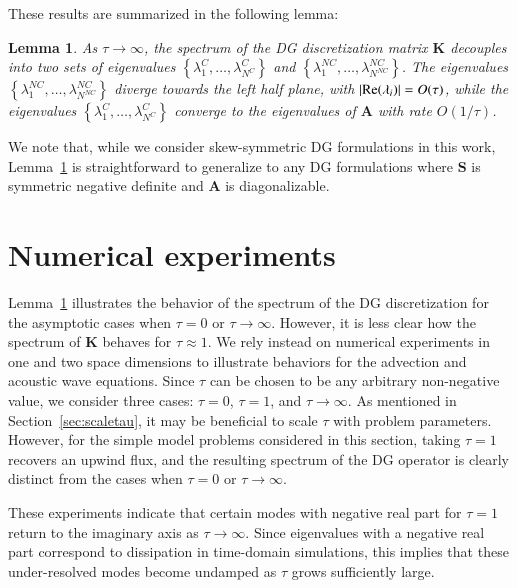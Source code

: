\documentclass[preprint,10pt]{elsarticle}
\newcommand{\LRb}[1]{\left| #1 \right|}
\newcommand{\LRc}[1]{\left\{ #1 \right\}}
\newtheorem{lemma}[theorem]{Lemma}
\newcommand{\note}[1]{#1}
\begin{document}
These results are summarized in the following lemma:
\begin{lemma}
As $\tau \rightarrow \infty$, the spectrum of the DG discretization matrix $\bm{K}$ decouples into two sets of eigenvalues $\LRc{\lambda^C_1,\ldots,\lambda^C_{N^C}}$ and $\LRc{\lambda^{NC}_1,\ldots,\lambda^{NC}_{N^{NC}}}$.  The eigenvalues $\LRc{\lambda^{NC}_1,\ldots,\lambda^{NC}_{N^{NC}}}$ diverge towards the left half plane, with $\LRb{{\rm Re}(\lambda_i)} = O(\tau)$, while  the eigenvalues $\LRc{\lambda^C_1,\ldots,\lambda^C_{N^C}}$ converge to the eigenvalues of $\bm{A}$ with rate $O(1/\tau)$.  
\label{lemma:eig}
\end{lemma}
We note that, while we consider skew-symmetric DG formulations in this work, Lemma~\ref{lemma:eig} is straightforward to generalize to any DG formulations where $\bm{S}$ is symmetric negative definite and $\bm{A}$ is diagonalizable.%


\section{Numerical experiments}

Lemma~\ref{lemma:eig} illustrates the behavior of the \note{spectrum} of the DG discretization for the asymptotic cases when $\tau = 0$ or $\tau \rightarrow \infty$.  However, it is less clear how the \note{spectrum} of $\bm{K}$ behaves for $\tau \approx 1$.  We rely instead on numerical experiments in one and two space dimensions to illustrate behaviors for the advection and acoustic wave equations.  {\note{Since $\tau$ can be chosen to be any arbitrary non-negative value, we consider three cases: $\tau = 0$, $\tau = 1$, and $\tau \rightarrow \infty$.  As mentioned in Section~\ref{sec:scaletau}, it may be beneficial to scale $\tau$ with problem parameters.  However, for the simple model problems considered in this section, taking $\tau = 1$ recovers an upwind flux, and the resulting spectrum of the DG operator is clearly distinct from the cases when $\tau = 0$ or $\tau \rightarrow \infty$.}  }

These experiments indicate that certain modes with negative real part for $\tau = 1$ return to the imaginary axis as $\tau \rightarrow \infty$.  Since eigenvalues with a negative real part correspond to dissipation in time-domain simulations, this implies that these under-resolved modes become undamped as $\tau$ grows sufficiently large.  
\end{document}
